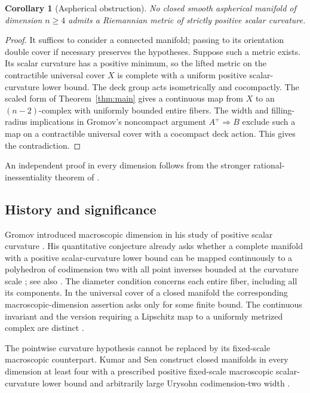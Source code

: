 \documentclass[11pt]{article}
\numberwithin{equation}{section}
\newtheorem{corollary}[theorem]{Corollary}
\theoremstyle{definition}
\theoremstyle{remark}
\begin{document}
\begin{corollary}[Aspherical obstruction]\label{cor:aspherical}
No closed smooth aspherical manifold of dimension \(n\ge4\) admits
a Riemannian metric of strictly positive scalar curvature.
\end{corollary}

\begin{proof}
It suffices to consider a connected manifold; passing to its orientation
double cover if necessary preserves the hypotheses. Suppose such a metric
exists. Its scalar curvature has a positive minimum, so the lifted metric
on the contractible universal cover \(X\) is complete with a uniform
positive scalar-curvature lower bound. The deck group acts isometrically
and cocompactly. The scaled form of Theorem~\ref{thm:main} gives a
continuous map from \(X\) to an \((n-2)\)-complex with uniformly bounded
entire fibers. The width and filling-radius implications in Gromov's
noncompact argument \(A^+\Rightarrow B\)
\citep[\S3, pp.~6--8]{gromov2017Dozen} exclude such a map on a
contractible universal cover with a cocompact deck action. This gives
the contradiction.
\end{proof}

An independent proof in every dimension follows from the stronger
rational-inessentiality theorem of
\citet[Theorem~1.1 and Corollary~1.2]{openai2026RationalInessentiality}.

\subsection{History and significance}

Gromov introduced macroscopic dimension in his study of positive scalar
curvature \citep[\S2]{gromov1996}. His quantitative conjecture already asks
whether a complete manifold with a positive scalar-curvature lower bound
can be mapped continuously to a polyhedron of codimension two with all
point inverses bounded at the curvature scale
\citep[\S\(2\frac12\)]{gromov1996}; see also
\citep[p.~3180, Comments after Conjecture~3.2]{gromov2019Mean}.
The diameter condition concerns each entire fiber, including all its
components. In the universal cover of a closed manifold the corresponding
macroscopic-dimension assertion asks only for some finite bound.
The continuous invariant and the version requiring a Lipschitz map to a
uniformly metrized complex are distinct
\citep[Definitions~1.1--1.2]{dranishnikov2014}.

The pointwise curvature hypothesis cannot be replaced by its fixed-scale
macroscopic counterpart. Kumar and Sen construct closed manifolds in
every dimension at least four with a prescribed positive fixed-scale
macroscopic scalar-curvature lower bound and arbitrarily large
Urysohn codimension-two width \citep[Theorem~A]{kumarSen2026Width}.
\end{document}
